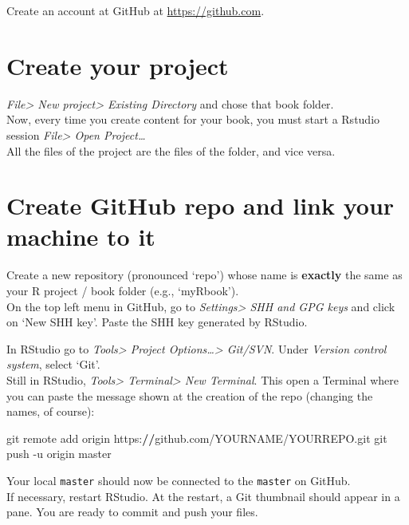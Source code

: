 \documentclass[]{book}
\newenvironment{Shaded}{}{}
\newcommand{\ErrorTok}[1]{\textcolor[rgb]{1.00,0.00,0.00}{\textbf{#1}}}
\newcommand{\NormalTok}[1]{#1}
\newcommand{\OperatorTok}[1]{\textcolor[rgb]{0.40,0.40,0.40}{#1}}
\theoremstyle{definition}
\theoremstyle{definition}
\theoremstyle{definition}
\theoremstyle{remark}
\begin{document}
Create an account at GitHub at
\href{https://github.com/join}{https://github.com}.

\hypertarget{create-your-project}{%
\section{Create your project}\label{create-your-project}}

\emph{File\textgreater{} New project\textgreater{} Existing Directory}
and chose that book folder.\\
Now, every time you create content for your book, you must start a
Rstudio session \emph{File\textgreater{} Open Project\ldots{}}\\
All the files of the project are the files of the folder, and vice
versa.

\hypertarget{create-github-repo-and-link-your-machine-to-it}{%
\section{Create GitHub repo and link your machine to
it}\label{create-github-repo-and-link-your-machine-to-it}}

Create a new repository (pronounced `repo') whose name is
\textbf{exactly} the same as your R project / book folder (e.g.,
`myRbook').\\
On the top left menu in GitHub, go to \emph{Settings\textgreater{} SHH
and GPG keys} and click on `New SHH key'. Paste the SHH key generated by
RStudio.

In RStudio go to \emph{Tools\textgreater{} Project
Options\ldots\textgreater{} Git/SVN}. Under \emph{Version control
system}, select `Git'.\\
Still in RStudio, \emph{Tools\textgreater{} Terminal\textgreater{} New
Terminal}. This open a Terminal where you can paste the message shown at
the creation of the repo (changing the names, of course):

\begin{Shaded}
\begin{Highlighting}[]
\NormalTok{git remote add origin https}\OperatorTok{:}\ErrorTok{//}\NormalTok{github.com}\OperatorTok{/}\NormalTok{YOURNAME}\OperatorTok{/}\NormalTok{YOURREPO.git}
\NormalTok{git push }\OperatorTok{-}\NormalTok{u origin master}
\end{Highlighting}
\end{Shaded}

Your local \texttt{master} should now be connected to the
\texttt{master} on GitHub.\\
If necessary, restart RStudio. At the restart, a Git thumbnail should
appear in a pane. You are ready to commit and push your files.
\end{document}
